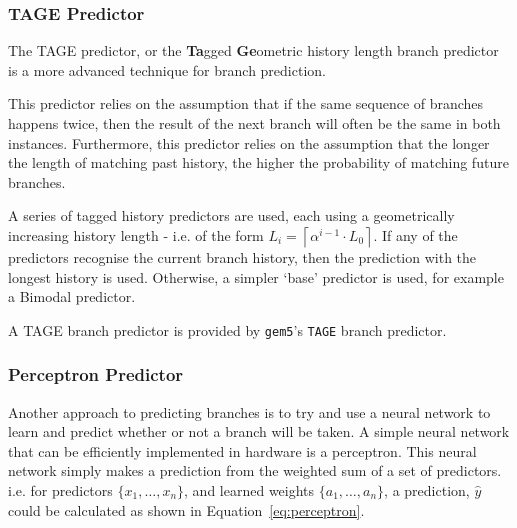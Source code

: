 \subsubsection{TAGE Predictor}
%

The TAGE predictor, or the \textbf{Ta}gged \textbf{Ge}ometric history
length branch predictor is a more advanced technique for branch
prediction.

This predictor relies on the assumption that if the same sequence of
branches happens twice, then the result of the next branch will often
be the same in both instances.
Furthermore, this predictor relies on the assumption that the longer
the length of matching past history, the higher
the probability of matching future branches.~\cite{Seznec2006}

A series of tagged history predictors are used, each using a geometrically
increasing history length - i.e. of the form
\(L_i = \left\lceil \alpha^{i-1} \cdot L_0 \right\rceil\).
If any of the predictors recognise the current branch history,
then the prediction with the longest history is used.
Otherwise, a simpler `base' predictor is used, for example a Bimodal
predictor.~\cite{Seznec2007,Michaud2005}

A TAGE branch predictor is provided by \texttt{gem5}'s \texttt{TAGE}
branch predictor. %

\subsubsection{Perceptron Predictor}

%

Another approach to predicting branches is to try and use a
neural network to learn and predict whether or not a branch will
be taken.
A simple neural network that can be efficiently implemented in
hardware is a perceptron.
This neural network simply makes a prediction from the weighted
sum of a set of predictors. i.e. for predictors \(\{ x_1, \ldots , x_n \}\),
and learned weights \(\{ a_1, \ldots , a_n \}\), a prediction, \(\hat{y}\) could
be calculated as shown in Equation~\ref{eq:perceptron}.

